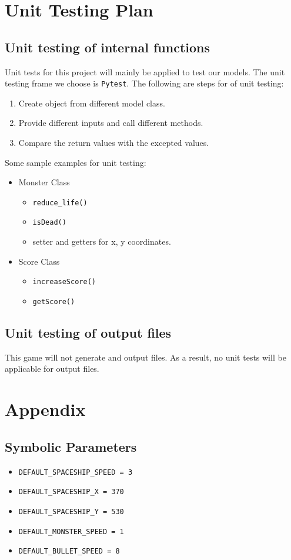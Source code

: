 \documentclass[12pt]{article}
\begin{document}
\section{Unit Testing Plan}
\subsection{Unit testing of internal functions}
Unit tests for this project will mainly be applied to test
our models. The unit testing frame we choose is \verb|Pytest|. The following are steps for of unit testing:
\begin{enumerate}[1.]
\item Create object from different model class.
\item Provide different inputs and call different methods.
\item Compare the return values with the excepted values.
\end{enumerate}
Some sample examples for  unit testing:
\begin{itemize}
\item Monster Class
\begin{itemize}
\item \verb|reduce_life()|
\item \verb|isDead()|
\item setter and getters for x, y coordinates.
\end{itemize}
\item Score Class
\begin{itemize}
\item \verb|increaseScore()|
\item \verb|getScore()|
\end{itemize}
\end{itemize}
\subsection{Unit testing of output files}
This game will not generate and output files. As a result,
no unit tests will be applicable for output files.
\section{Appendix}
\subsection{Symbolic Parameters}
\begin{itemize}
\item \verb|DEFAULT_SPACESHIP_SPEED = 3|
\item \verb|DEFAULT_SPACESHIP_X = 370|
\item \verb|DEFAULT_SPACESHIP_Y = 530|
\item \verb|DEFAULT_MONSTER_SPEED = 1|
\item \verb|DEFAULT_BULLET_SPEED = 8|
\end{itemize}
\end{document}

